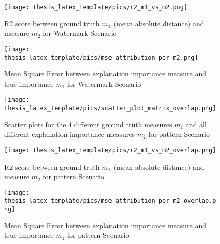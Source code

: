 \begin{figure}[!htb]
    \centering
    \texttt{[image: thesis\_latex\_template/pics/r2\_m1\_vs\_m2.png]}
    \caption{R2 score between ground truth $m_1$ (mean absolute distance) and measure $m_2$ for Watermark Scenario}
\label{fig:enter-label}
\end{figure}

\begin{figure}[!htb]
    \centering
    \texttt{[image: thesis\_latex\_template/pics/mse\_attribution\_per\_m2.png]}
    \caption{Mean Square Error between explanation importance measure and true importance $m_1$ for Watermark Scenario}
    \label{fig:enter-label}
\end{figure}


\begin{figure}[!htb]
	\centering
	\label{fig:some_more}
	\texttt{[image: thesis\_latex\_template/pics/scatter\_plot\_matrix\_overlap.png]}
	\caption[Test]{Scatter plots for the 4 different ground truth measures $m_1$ and all different explanation importance measures $m_2$ for pattern Scenario}
\end{figure}

\begin{figure}[!htb]
    \centering
    \texttt{[image: thesis\_latex\_template/pics/r2\_m1\_vs\_m2\_overlap.png]}
    \caption{R2 score between ground truth $m_1$ (mean absolute distance) and measure $m_2$ for pattern Scenario}
\label{fig:enter-label}
\end{figure}

\begin{figure}[!htb]
    \centering
    \texttt{[image: thesis\_latex\_template/pics/mse\_attribution\_per\_m2\_overlap.png]}
    \caption{Mean Square Error between explanation importance measure and true importance $m_1$ for pattern Scenario}
    \label{fig:enter-label}
\end{figure}